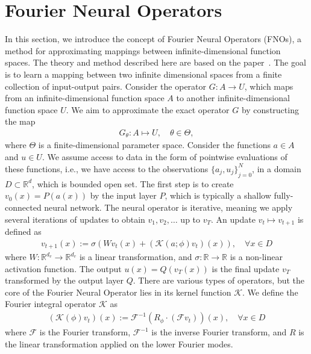 \section{Fourier Neural Operators}
In this section, we introduce the concept of Fourier Neural Operators (FNOs), a method for approximating mappings between infinite-dimensional function spaces.
The theory and method described here are based on the paper~\cite{FNO_2021}.
The goal is to learn a mapping between two infinite dimensional spaces from a finite collection of input-output pairs. 
Consider the operator $G: A \to U$, which maps from an infinite-dimensional function space $A$ to another infinite-dimensional function space $U$.
We aim to approximate the exact operator $G$ by constructing the map
\begin{align*}
    G_{\theta}: A \mapsto U, \quad \theta \in \Theta,
\end{align*} 
where $\Theta$ is a finite-dimensional parameter space.
Consider the functions $a \in A$ and $u \in U$.
We assume access to data in the form of pointwise evaluations of these functions, i.e., we have access to the observations ${\{a_j, u_j \}}_{j=0}^N$, in a domain $D \subset \mathbb{R}^d$, which is bounded open set.
The first step is to create $v_0(x) = P(a(x))$ by the input layer $P$, which is typically a shallow fully-connected neural network.
The neural operator is iterative, meaning we apply several iterations of updates to obtain $v_1, v_2, \ldots$ up to $v_T$.
An update $v_t \mapsto v_{t+1}$ is defined as
\begin{align}
    v_{t+1}(x) := \sigma \left( W v_t(x) + \left( \mathcal{K}(a;\phi)v_t \right) (x) \right), \quad \forall x \in D
\end{align}
where $W: \mathbb{R}^{d_v} \to \mathbb{R}^{d_v}$ is a linear transformation, and $\sigma: \mathbb{R} \to \mathbb{R}$ is a non-linear activation function.
The output $u(x) = Q(v_T(x))$ is the final update $v_T$ transformed by the output layer $Q$.
There are various types of operators, but the core of the Fourier Neural Operator lies in its kernel function $\mathcal{K}$.
We define the Fourier integral operator $\mathcal{K}$ as 
\begin{align}
    \left( \mathcal{K}(\phi)v_t \right) (x) := \mathcal{F}^{-1} \left( R_{\phi} \cdot (\mathcal{F}v_t ) \right)(x), \quad \forall x \in D
\end{align}
where $\mathcal{F}$ is the Fourier transform, $\mathcal{F}^{-1}$ is the inverse Fourier transform, and $R$ is the linear transformation applied on the lower Fourier modes. 
